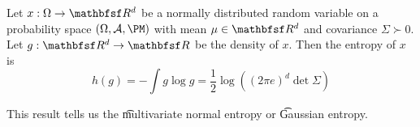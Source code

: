 


\begin{proposition}
Let $x: \Omega \to \R^d$ be a normally distributed random variable on a probability space $(\Omega, \CA, \PM)$ with mean $\mu \in \R^d$ and covariance $\Sigma \succ 0$. Let $g: \R^d \to \R$ be the density of $x$. Then the entropy of $x$ is
\[
  h(g) = -\int g \log g = \frac{1}{2} \log ((2\pi e)^d \det\Sigma)
\]
\end{proposition}

This result tells us the \t{multivariate normal entropy} or \t{Gaussian entropy}.


\blankpage
